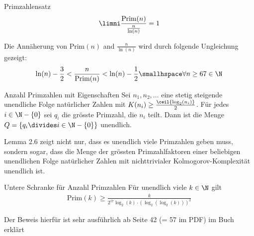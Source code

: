 \begin{theorem}[]{Primzahlensatz}
    \vspace{-0.3cm}
    \begin{align*}
        \limni \frac{\text{Prim}(n)}{\frac{n}{\ln(n)}} = 1
    \end{align*}
\end{theorem}
Die Annäherung von $\text{Prim}(n)$ and $\frac{n}{\ln(n)}$ wird durch folgende Ungleichung gezeigt:
\begin{align*}
    \ln(n) - \frac{3}{2} < \frac{n}{\text{Prim}(n)} < \ln(n) - \frac{1}{2} \smallhspace \forall n \geq 67 \in \N
\end{align*}

\begin{lemma}[]{Anzahl Primzahlen mit Eigenschaften}
    Sei $n_1, n_2, \ldots$ eine stetig steigende unendliche Folge natürlicher Zahlen mit $K(n_i) \geq \frac{\ceil{\log_2(n_i)}}{2}$.
    Für jedes $i \in \N - \{ 0 \}$ sei $q_i$ die grösste Primzahl, die $n_i$ teilt. 
    Dann ist die Menge $Q = \{ q_i \divides i \in \N - \{ 0 \} \}$ unendlich.
\end{lemma}

Lemma 2.6 zeigt nicht nur, dass es unendlich viele Primzahlen geben muss, sondern sogar, dass die Menge der grössten Primzahlfaktoren einer beliebigen unendlichen Folge natürlicher Zahlen mit nichttrivialer Kolmogorov-Komplexität unendlich ist.

\begin{theorem}[]{Untere Schranke für Anzahl Primzahlen}
    Für unendlich viele $k \in \N$ gilt
    \begin{align*}
        \text{Prim}(k) \geq \frac{k}{2^17 \log_2(k) \cdot (\log_2(\log_2(k)))^2}
    \end{align*}
\end{theorem}

Der Beweis hierfür ist sehr ausführlich ab Seite 42 (= 57 im PDF) im Buch erklärt
